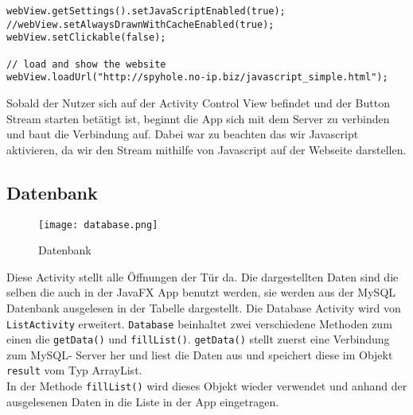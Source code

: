 \begin{lstlisting}[caption={Aufbau der Verbindung und darstellen des Streams},captionpos=b]
webView.getSettings().setJavaScriptEnabled(true);
//webView.setAlwaysDrawnWithCacheEnabled(true);
webView.setClickable(false);

// load and show the website
webView.loadUrl("http://spyhole.no-ip.biz/javascript_simple.html");

\end{lstlisting}
Sobald der Nutzer sich auf der Activity Control View befindet und der Button Stream starten betätigt ist, beginnt die App sich mit dem Server zu verbinden und baut die Verbindung auf. Dabei war zu beachten das wir Javascript aktivieren, da wir den Stream mithilfe von Javascript auf der Webseite darstellen. 

\subsection{Datenbank}
\begin{figure}[h]
  \begin{center}
    \texttt{[image: database.png]}
  		  \caption{Datenbank}
     \label{fig.Prozess}
  \end{center}
\end{figure}
Diese Activity stellt alle Öffnungen der Tür da. Die dargestellten Daten sind die selben die auch in der JavaFX App benutzt werden, sie werden aus der MySQL Datenbank ausgelesen in der Tabelle dargestellt.
Die Database Activity wird von \texttt{ListActivity} erweitert. \texttt{Database} beinhaltet zwei verschiedene Methoden zum einen die \texttt{getData()} und \texttt{fillList()}.  \texttt{getData()} stellt zuerst eine Verbindung zum MySQL- Server her und liest die Daten aus und speichert diese im Objekt \texttt{result} vom Typ ArrayList.\\
In der Methode \texttt{fillList()} wird dieses Objekt wieder verwendet und anhand der ausgelesenen Daten in die Liste in der App eingetragen.